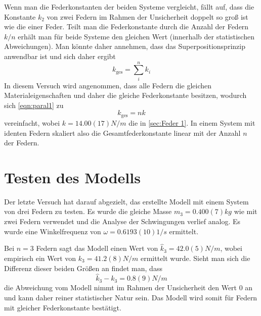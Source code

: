 Wenn man die Federkonstanten der beiden Systeme vergleicht, fällt auf, dass die Konstante \( k_2 \) von zwei Federn im Rahmen der Unsicherheit doppelt so groß ist wie die einer Feder. Teilt man die Federkonstante durch die Anzahl der Federn \( k/n \) erhält man für beide Systeme den gleichen Wert (innerhalb der statistischen Abweichungen). Man könnte daher annehmen, dass das Superpositionsprinzip anwendbar ist und sich daher ergibt
\begin{equation}\label{eqn:paral1}
	k_{\text{ges}} = \sum_{i}^{n} k_i
\end{equation}
In diesem Versuch wird angenommen, dass alle Federn die gleichen Materialeigenschaften und daher die gleiche Federkonstante besitzen, wodurch sich \autoref{eqn:paral1} zu
\begin{equation}\label{eqn:paral2}
	k_{\text{ges}} = nk
\end{equation}
vereinfacht, wobei \( k = 14.00(17) \unit{N/m} \) die in \autoref{sec:Feder 1}. In einem System mit identen Federn skaliert also die Gesamtfederkonstante linear mit der Anzahl \( n \) der Federn.

\section{Testen des Modells}
Der letzte Versuch hat darauf abgezielt, das erstellte Modell mit einem System von drei Federn zu testen. Es wurde die gleiche Masse \( m_3 = 0.400(7) \unit{kg} \) wie mit zwei Federn verwendet und die Analyse der Schwingungen verlief analog. Es wurde eine Winkelfrequenz von \( \omega = 0.6193(10) \unit{1/s} \) ermittelt.

Bei \( n = 3 \) Federn sagt das Modell einen Wert von \( \hat{k}_3 = 42.0(5) \unit{N/m} \), wobei empirisch ein Wert von \( k_3 = 41.2(8) \unit{N/m} \) ermittelt wurde. Sieht man sich die Differenz dieser beiden Größen an findet man, dass
\begin{equation}\label{eqn:diff}
	\hat{k}_3 - k_3 = 0.8(9) \unit{N/m}
\end{equation}
die Abweichung vom Modell nimmt im Rahmen der Unsicherheit den Wert 0 an und kann daher reiner statistischer Natur sein. Das Modell wird somit für Federn mit gleicher Federkonstante bestätigt.






